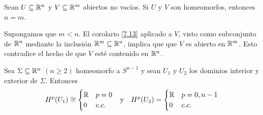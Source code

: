 \documentclass[CV.tex]{subfiles}
\begin{document}
\begin{coro}
Sean $U\subseteq\mathbb{R}^n$ y $V\subseteq\mathbb{R}^m$ abiertos no vacíos. Si $U$ y $V$ son homeomorfos, entonces $n=m$.
\end{coro}
\begin{dem}
Supongamos que $m<n$. El corolario \ref{7.13} aplicado a $V$, visto como subconjunto de $\mathbb{R}^n$ mediante la inclusión $\mathbb{R}^m\subseteq\mathbb{R}^n$, implica que que $V$ es abierto en $\mathbb{R}^m$. Esto contradice el hecho de que $V$ esté contenido en $\mathbb{R}^n$. \QED
\end{dem}

\begin{prop}
Sea $\Sigma\subseteq\mathbb{R}^n$ $(n\geq 2)$ homeomorfo a $S^{n-1}$ y sean $U_1$ y $U_2$ los dominios interior y exterior de $\Sigma$. Entonces
\begin{align*}
&H^p(U_1)\cong \begin{cases}
\mathbb{R} & p=0\\
0 & c.c.
\end{cases} &\text{y}& & H^p(U_2)=\begin{cases}
\mathbb{R} & p=0,n-1\\
0 & c.c.
\end{cases}
\end{align*}
\end{prop}
\begin{dem}
\end{dem}

\begin{ej}
\end{ej}
\end{document}
